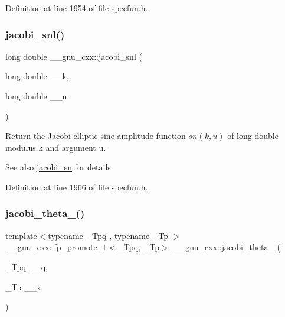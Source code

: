 Definition at line 1954 of file specfun.\+h.

\mbox{\label{group__mathsf__gnu_ga1c13539e3b051a07b1c28aa8a0aeb1b4}} 
\subsubsection{\texorpdfstring{jacobi\+\_\+snl()}{jacobi\_snl()}}
{\footnotesize\ttfamily long double \+\_\+\+\_\+gnu\+\_\+cxx\+::jacobi\+\_\+snl (\begin{DoxyParamCaption}\item[{long double}]{\+\_\+\+\_\+k,  }\item[{long double}]{\+\_\+\+\_\+u }\end{DoxyParamCaption})\hspace{0.3cm}{\ttfamily [inline]}}

Return the Jacobi elliptic sine amplitude function $ sn(k,u) $ of {\ttfamily long double} modulus {\ttfamily k} and argument {\ttfamily u}.

\begin{DoxySeeAlso}{See also}
\hyperlink{group__mathsf__gnu_ga49d5e18152dd0dd0f496b8c8582e7045}{jacobi\+\_\+sn} for details. 
\end{DoxySeeAlso}


Definition at line 1966 of file specfun.\+h.

\mbox{\label{group__mathsf__gnu_ga996ca8c1fff75e2d4f196e99e0919933}} 
\subsubsection{\texorpdfstring{jacobi\+\_\+theta\+\_()}{jacobi\_theta\_1()}}
{\footnotesize\ttfamily template$<$typename \+\_\+\+Tpq , typename \+\_\+\+Tp $>$ \\
\+\_\+\+\_\+gnu\+\_\+cxx\+::fp\+\_\+promote\+\_\+t$<$\+\_\+\+Tpq, \+\_\+\+Tp$>$ \+\_\+\+\_\+gnu\+\_\+cxx\+::jacobi\+\_\+theta\+\_ (\begin{DoxyParamCaption}\item[{\+\_\+\+Tpq}]{\+\_\+\+\_\+q,  }\item[{\+\_\+\+Tp}]{\+\_\+\+\_\+x }\end{DoxyParamCaption})\hspace{0.3cm}{\ttfamily [inline]}}

